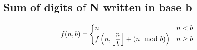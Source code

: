 \subsection{Sum of digits of N written in base b}

$$
f(n, b) = \begin{cases}
    n & n < b\\
    f \left( n, \floor*{\dfrac{n}{b}} + (n \mod b) \right) & n \geq b \\
\end{cases}
$$